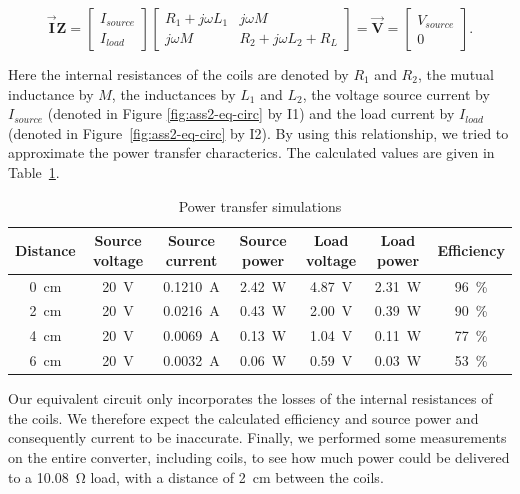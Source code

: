 \documentclass[11pt,titlepage]{report}
\begin{document}
\begin{equation}
	\mathbf{\vec{I}} \mathbf{Z}=
	\begin{bmatrix}
		I_{source} \\
		I_{load}
	\end{bmatrix}
	\begin{bmatrix}
		R_1 + j \omega L_1 & j \omega M \\
		j \omega M & R_2 + j \omega L_2 + R_L
	\end{bmatrix}
	= \mathbf{\vec{V}} =
	\begin{bmatrix}
		V_{source} \\
		0
	\end{bmatrix} .
\end{equation}

Here the internal resistances of the coils are denoted by $R_1$ and $R_2$, the mutual inductance by $M$, the inductances by $L_1$ and $L_2$, the voltage source current by $I_{source}$ (denoted in Figure \ref{fig:ass2-eq-circ} by I1) and the load current by $I_{load}$ (denoted in Figure~\ref{fig:ass2-eq-circ} by I2). By using this relationship, we tried to approximate the power transfer characterics. The calculated values are given in Table~\ref{tab:ass2-power-sim}.

\begin{table}[H]
	\centering
	\caption{Power transfer simulations}
	\label{tab:ass2-power-sim}
	\begin{tabular}{c c c c c c c}
		\hline\hline
		Distance & Source voltage & Source current & Source power & Load voltage & Load power & Efficiency \\
		\hline
		\SI{0}{cm} & \SI{20}{V} & \SI{0.1210}{A} & \SI{2.42}{W} & \SI{4.87}{V} & \SI{2.31}{W} & \SI{96}{\percent} \\
		\SI{2}{cm} & \SI{20}{V} & \SI{0.0216}{A} & \SI{0.43}{W} & \SI{2.00}{V} & \SI{0.39}{W} & \SI{90}{\percent} \\
		\SI{4}{cm} & \SI{20}{V} & \SI{0.0069}{A} & \SI{0.13}{W} & \SI{1.04}{V} & \SI{0.11}{W} & \SI{77}{\percent} \\
		\SI{6}{cm} & \SI{20}{V} & \SI{0.0032}{A} & \SI{0.06}{W} & \SI{0.59}{V} & \SI{0.03}{W} & \SI{53}{\percent} \\
		\hline
		\end{tabular}
\end{table}

Our equivalent circuit only incorporates the losses of the internal resistances of the coils. We therefore expect the calculated efficiency and source power and consequently current to be inaccurate. Finally, we performed some measurements on the entire converter, including coils, to see how much power could be delivered to a \SI{10.08}{\ohm} load, with a distance of \SI{2}{cm} between the coils.
\end{document}
